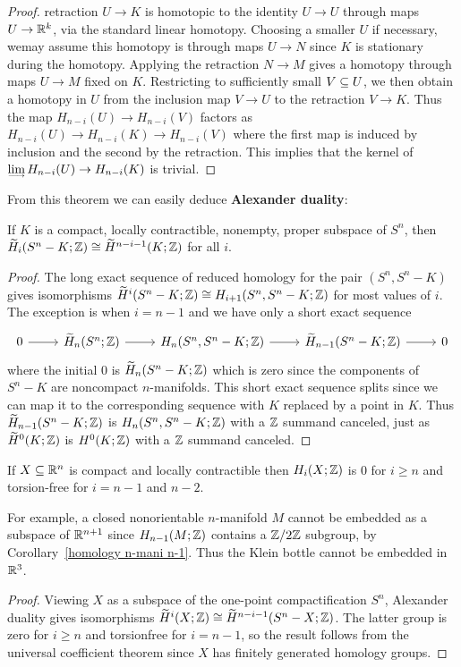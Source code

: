 \begin{proof}
retraction $U\to K$ is homotopic to the identity $U\to U$ through maps $U\to\mathbb{R}^k$, via the standard linear homotopy. Choosing a smaller $U$ if necessary, wemay assume this homotopy is through maps $U\to N$ since $K$ is stationary during the homotopy. Applying the retraction $N\to M$ gives a homotopy through maps $U\to M$ fixed on $K$. Restricting to sufficiently small $V\subseteq U$, we then obtain a homotopy in $U$ from the inclusion map $V\to U$ to the retraction $V\to K$. Thus the map $H_{n-i}(U)\to H_{n-i}(V)$ factors as $H_{n-i}(U)\to H_{n-i}(K)\to H_{n-i}(V)$ where the first map is induced by inclusion and the second by the retraction. This implies that the kernel of $\rlim H_{n-i}(U)\to H_{n-i}(K)$ is trivial.
\end{proof}
From this theorem we can easily deduce \textbf{Alexander duality}:
\begin{corollary}
If $K$ is a compact, locally contractible, nonempty, proper subspace of $S^n$, then $\widetilde{H}_i(S^n-K;\mathbb{Z})\cong\widetilde{H}^{n-i-1}(K;\mathbb{Z})$ for all $i$.
\end{corollary}
\begin{proof}
The long exact sequence of reduced homology for the pair $(S^n,S^n-K)$ gives
isomorphisms $\widetilde{H}^i(S^n-K;\mathbb{Z})\cong H_{i+1}(S^n,S^n-K;\mathbb{Z})$ for most values of $i$. The exception is when $i=n-1$ and we have only a short exact sequence
\[\begin{tikzcd}
0\ar[r]&\widetilde{H}_n(S^n;\Z)\ar[r]&H_n(S^n,S^n-K;\Z)\ar[r]&\widetilde{H}_{n-1}(S^n-K;\Z)\ar[r]&0
\end{tikzcd}\]
where the initial $0$ is $\widetilde{H}_n(S^n-K;\mathbb{Z})$ which is zero since the components of $S^n-K$ are noncompact $n$-manifolds. This short exact sequence splits since we can map it to the corresponding sequence with $K$ replaced by a point in $K$. Thus $\widetilde{H}_{n-1}(S^n-K;\mathbb{Z})$ is $H_n(S^n,S^n-K;\mathbb{Z})$ with a $\mathbb{Z}$ summand canceled, just as $\widetilde{H}^0(K;\mathbb{Z})$ is $H^0(K;\mathbb{Z})$ with a $\mathbb{Z}$ summand canceled.
\end{proof}
\begin{corollary}
If $X\subseteq\mathbb{R}^n$ is compact and locally contractible then $H_i(X;\mathbb{Z})$ is $0$ for $i\geq n$ and torsion-free for $i=n-1$ and $n-2$.
\end{corollary}
For example, a closed nonorientable $n$-manifold $M$ cannot be embedded as a subspace of $\mathbb{R}^{n+1}$ since $H_{n-1}(M;\mathbb{Z})$ contains a $\mathbb{Z}/2\mathbb{Z}$ subgroup, by Corollary~\ref{homology n-mani n-1}. Thus the Klein bottle cannot be embedded in $\mathbb{R}^3$. 
\begin{proof}
Viewing $X$ as a subspace of the one-point compactification $S^n$, Alexander
duality gives isomorphisms $\widetilde{H}^i(X;\mathbb{Z})\cong\widetilde{H}^{n-i-1}(S^n-X;\mathbb{Z})$. The latter group is zero for $i\geq n$ and torsionfree for $i=n-1$, so the result follows from the universal coefficient theorem since $X$ has finitely generated homology groups.
\end{proof}

